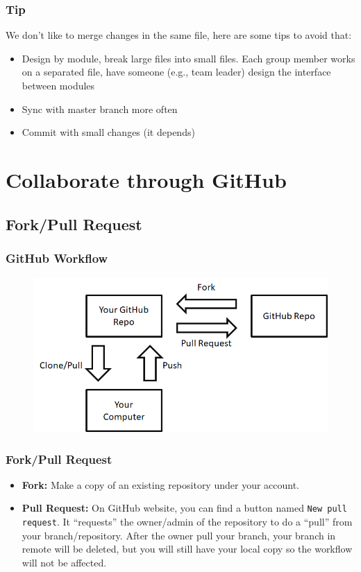 \documentclass{beamer}
\begin{document}
			\begin{frame}
				\frametitle{Tip}
				We don't like to merge changes in the same file, here are some tips to avoid that:
				\begin{itemize}
					\item Design by module, break large files into small files. Each group member works on a separated file, have someone (e.g., team leader) design the interface between modules
					\item Sync with master branch more often
					\item Commit with small changes (it depends)
				\end{itemize}
			\end{frame}

	\section{Collaborate through GitHub}
		\subsection{Fork/Pull Request}
			\begin{frame}
				\frametitle{GitHub Workflow}
				\begin{figure}[!h]
					\centering
					\includegraphics[width=\textwidth]{github-workflow}
				\end{figure}
			\end{frame}
			\begin{frame}
				\frametitle{Fork/Pull Request}
				\begin{itemize}
					\item \textbf{Fork:} Make a copy of an existing repository under your account. 
					\item \textbf{Pull Request: }On GitHub website, you can find a button named \texttt{New pull request}. It ``requests'' the owner/admin of the repository to do a ``pull'' from your branch/repository. After the owner pull your branch, your branch in remote will be deleted, but you will still have your local copy so the workflow will not be affected.
				\end{itemize}				
			\end{frame}
\end{document}

